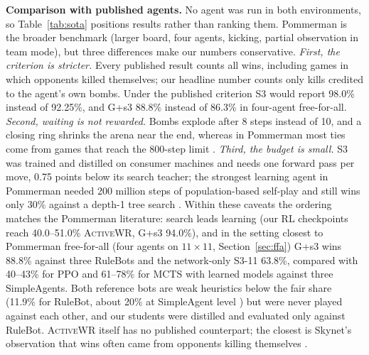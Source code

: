 \documentclass[11pt]{article}
\newcommand{\awr}{\textsc{ActiveWR}}
\begin{document}
\textbf{Comparison with published agents.} No agent was run in both environments, so Table~\ref{tab:sota} positions results rather than ranking them. Pommerman is the broader benchmark (larger board, four agents, kicking, partial observation in team mode), but three differences make our numbers conservative. \emph{First, the criterion is stricter.} Every published result counts all wins, including games in which opponents killed themselves; our headline number counts only kills credited to the agent's own bombs. Under the published criterion S3 would report 98.0\% instead of 92.25\%, and G+s3 88.8\% instead of 86.3\% in four-agent free-for-all. \emph{Second, waiting is not rewarded.} Bombs explode after 8 steps instead of 10, and a closing ring shrinks the arena near the end, whereas in Pommerman most ties come from games that reach the 800-step limit \cite{weil2023}. \emph{Third, the budget is small.} S3 was trained and distilled on consumer machines and needs one forward pass per move, 0.75 points below its search teacher; the strongest learning agent in Pommerman needed 200 million steps of population-based self-play and still wins only 30\% against a depth-1 tree search \cite{huynh2024,osogami2019}. Within these caveats the ordering matches the Pommerman literature: search leads learning (our RL checkpoints reach 40.0--51.0\% \awr{}, G+s3 94.0\%), and in the setting closest to Pommerman free-for-all (four agents on $11\times11$, Section~\ref{sec:ffa}) G+s3 wins 88.8\% against three RuleBots and the network-only S3-11 63.8\%, compared with 40--43\% for PPO \cite{gao2019hard} and 61--78\% for MCTS with learned models \cite{weil2023} against three SimpleAgents. Both reference bots are weak heuristics below the fair share (11.9\% for RuleBot, about 20\% at SimpleAgent level \cite{resnick2018pommerman}) but were never played against each other, and our students were distilled and evaluated only against RuleBot. \awr{} itself has no published counterpart; the closest is Skynet's observation that wins often came from opponents killing themselves \cite{gao2019skynet}.

\end{document}
